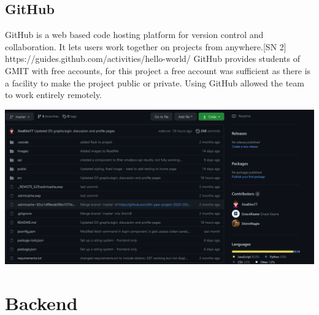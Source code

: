 \subsection{GitHub}
GitHub is a web based code hosting platform for version control and collaboration. It lets users work together on projects from anywhere.[SN 2] https://guides.github.com/activities/hello-world/
GitHub provides students of GMIT with free accounts, for this project a free account was sufficient as there is a facility to make the project public or private. Using GitHub allowed the team to work entirely remotely.
\begin{center}    
      \includegraphics[scale=0.5]{img/github.PNG}
\end{center}

\section{Backend}
